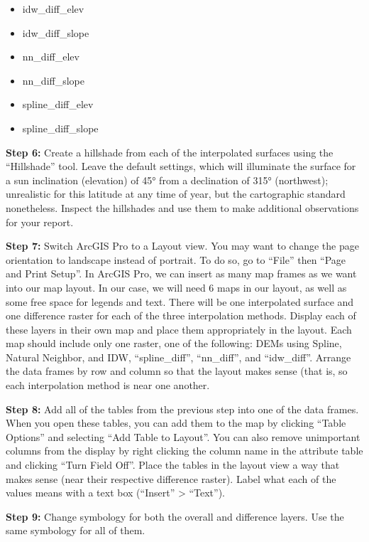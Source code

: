 \documentclass[
]{book}
\begin{document}
\begin{itemize}
\item
  idw\_diff\_elev
\item
  idw\_diff\_slope
\item
  nn\_diff\_elev
\item
  nn\_diff\_slope
\item
  spline\_diff\_elev
\item
  spline\_diff\_slope
\end{itemize}

\textbf{Step 6:} Create a hillshade from each of the interpolated surfaces using the ``Hillshade'' tool. Leave the default settings, which will illuminate the surface for a sun inclination (elevation) of 45° from a declination of 315° (northwest); unrealistic for this latitude at any time of year, but the cartographic standard nonetheless. Inspect the hillshades and use them to make additional observations for your report.

\textbf{Step 7:} Switch ArcGIS Pro to a Layout view. You may want to change the page orientation to landscape instead of portrait. To do so, go to ``File'' then ``Page and Print Setup''. In ArcGIS Pro, we can insert as many map frames as we want into our map layout. In our case, we will need 6 maps in our layout, as well as some free space for legends and text. There will be one interpolated surface and one difference raster for each of the three interpolation methods. Display each of these layers in their own map and place them appropriately in the layout. Each map should include only one raster, one of the following: DEMs using Spline, Natural Neighbor, and IDW, ``spline\_diff'', ``nn\_diff'', and ``idw\_diff''. Arrange the data frames by row and column so that the layout makes sense (that is, so each interpolation method is near one another.

\textbf{Step 8:} Add all of the tables from the previous step into one of the data frames. When you open these tables, you can add them to the map by clicking ``Table Options'' and selecting ``Add Table to Layout''. You can also remove unimportant columns from the display by right clicking the column name in the attribute table and clicking ``Turn Field Off''. Place the tables in the layout view a way that makes sense (near their respective difference raster). Label what each of the values means
with a text box (``Insert'' \textgreater{} ``Text'').

\textbf{Step 9:} Change symbology for both the overall and difference layers. Use the same symbology for all of them.
\end{document}
